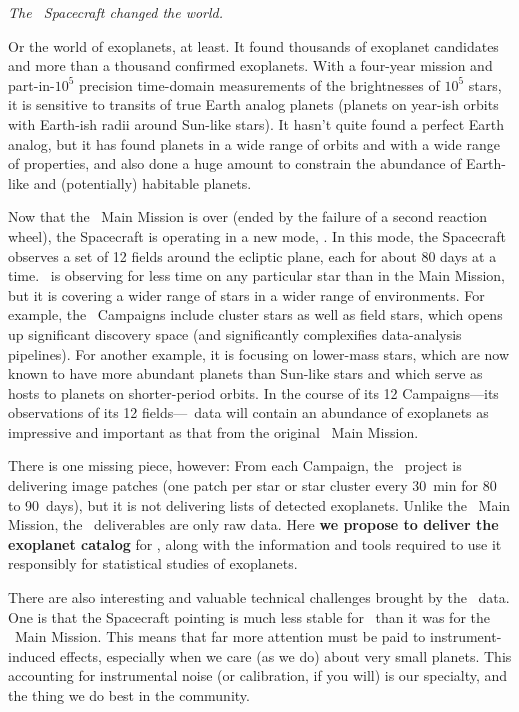 \documentclass[12pt,preprint]{aastex}
\begin{document}
\emph{The \kepler\ Spacecraft changed the world.}

Or the world of exoplanets, at least.
It found thousands of exoplanet candidates and more than a thousand
confirmed exoplanets.
With a four-year mission and part-in-$10^5$ precision time-domain
measurements of the brightnesses of $10^5$ stars, it is sensitive to
transits of true Earth analog planets (planets on year-ish orbits with
Earth-ish radii around Sun-like stars).
It hasn't quite found a perfect Earth analog, but it has found planets
in a wide range of orbits and with a wide range of properties, and
also done a huge amount to constrain the abundance of Earth-like and
(potentially) habitable planets.

Now that the \kepler\ Main Mission is over (ended by the failure of a
second reaction wheel), the Spacecraft is operating in a new mode,
\kt.
In this mode, the Spacecraft observes a set of 12 fields around the
ecliptic plane, each for about 80 days at a time.
\kt\ is observing for less time on any particular star than in the
Main Mission, but it is covering a wider range of stars in a wider
range of environments.
For example, the \kt\ Campaigns include cluster stars as well as field
stars, which opens up significant discovery space (and significantly
complexifies data-analysis pipelines).
For another example, it is focusing on lower-mass stars, which are now
known to have more abundant planets than Sun-like stars and which
serve as hosts to planets on shorter-period orbits.
In the course of its 12 Campaigns---its observations of its 12
fields---\kt\ data will contain an abundance of exoplanets as
impressive and important as that from the original \kepler\ Main
Mission.

There is one missing piece, however:
From each Campaign, the \kt\ project is delivering image patches (one
patch per star or star cluster every 30~min for 80 to 90~days), but it
is not delivering lists of detected exoplanets.
Unlike the \kepler\ Main Mission, the \kt\ deliverables are only raw
data.
Here \textbf{we propose to deliver the exoplanet catalog} for \kt,
along with the information and tools required to use it responsibly
for statistical studies of exoplanets.

There are also interesting and valuable technical challenges brought
by the \kt\ data.
One is that the Spacecraft pointing is much less stable for \kt\ than
it was for the \kepler\ Main Mission.
This means that far more attention must be paid to instrument-induced
effects, especially when we care (as we do) about very small planets.
This accounting for instrumental noise (or calibration, if you will)
is our specialty, and the thing we do best in the community.
\end{document}
